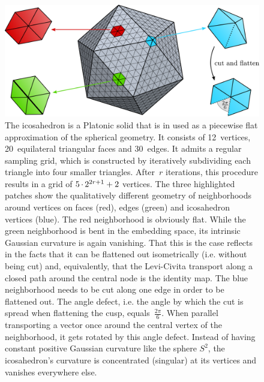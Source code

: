 \begin{figure}
    \centering
    \includegraphics[width=.8\textwidth]{figures/icosahedron_neighborhoods.pdf}
    \vspace*{1ex}
    \caption{\small
        The icosahedron is a Platonic solid that is in \cite{liu2018icoAltAz,gaugeIco2019,zhang2019orientation} used as a piecewise flat approximation of the spherical geometry.
        It consists of 12~vertices, 20~equilateral triangular faces and 30~edges.
        It admits a regular sampling grid, which is constructed by iteratively subdividing each triangle into four smaller triangles.
        After~$r$ iterations, this procedure results in a grid of ${5\mkern-1mu\cdot\mkern-1mu 2^{2r+1} + 2}$ vertices.
        The three highlighted patches show the qualitatively different geometry of neighborhoods around vertices on faces (red), edges (green) and icosahedron vertices (blue).
        The red neighborhood is obviously flat.
        While the green neighborhood is bent in the embedding space, its intrinsic Gaussian curvature is again vanishing.
        That this is the case reflects in the facts that it can be flattened out isometrically (i.e. without being cut) and, equivalently, that the Levi-Civita transport along a closed path around the central node is the identity map.
        The blue neighborhood needs to be cut along one edge in order to be flattened out.
        The angle defect, i.e. the angle by which the cut is spread when flattening the cusp, equals~$\frac{2\pi}{6}$.
        When parallel transporting a vector once around the central vertex of the neighborhood, it gets rotated by this angle defect.
        Instead of having constant positive Gaussian curvature like the sphere $S^2$, the icosahedron's curvature is concentrated (singular) at its vertices and vanishes everywhere else.
    }
    \label{fig:ico_neighborhoods}
\end{figure}


